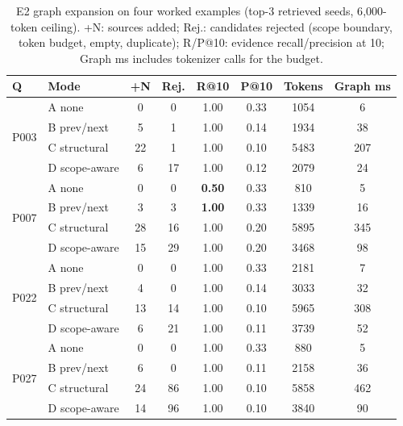 \begin{table}[t]
\centering\footnotesize
\caption{E2 graph expansion on four worked examples (top-3 retrieved seeds, 6{,}000-token ceiling). +N: sources added; Rej.: candidates rejected (scope boundary, token budget, empty, duplicate); R/P@10: evidence recall/precision at 10; Graph ms includes tokenizer calls for the budget.}
\label{tab:e2}
\setlength{\tabcolsep}{2.5pt}
\begin{tabular}{@{}llcccccc@{}}
\toprule
Q & Mode & +N & Rej. & R@10 & P@10 & Tokens & Graph ms \\
\midrule
\multirow{4}{*}{P003} & A none & 0 & 0 & 1.00 & 0.33 & 1054 & 6 \\
 & B prev/next & 5 & 1 & 1.00 & 0.14 & 1934 & 38 \\
 & C structural & 22 & 1 & 1.00 & 0.10 & 5483 & 207 \\
 & D scope-aware & 6 & 17 & 1.00 & 0.12 & 2079 & 24 \\
\midrule
\multirow{4}{*}{P007} & A none & 0 & 0 & \textbf{0.50} & 0.33 & 810 & 5 \\
 & B prev/next & 3 & 3 & \textbf{1.00} & 0.33 & 1339 & 16 \\
 & C structural & 28 & 16 & 1.00 & 0.20 & 5895 & 345 \\
 & D scope-aware & 15 & 29 & 1.00 & 0.20 & 3468 & 98 \\
\midrule
\multirow{4}{*}{P022} & A none & 0 & 0 & 1.00 & 0.33 & 2181 & 7 \\
 & B prev/next & 4 & 0 & 1.00 & 0.14 & 3033 & 32 \\
 & C structural & 13 & 14 & 1.00 & 0.10 & 5965 & 308 \\
 & D scope-aware & 6 & 21 & 1.00 & 0.11 & 3739 & 52 \\
\midrule
\multirow{4}{*}{P027} & A none & 0 & 0 & 1.00 & 0.33 & 880 & 5 \\
 & B prev/next & 6 & 0 & 1.00 & 0.11 & 2158 & 36 \\
 & C structural & 24 & 86 & 1.00 & 0.10 & 5858 & 462 \\
 & D scope-aware & 14 & 96 & 1.00 & 0.10 & 3840 & 90 \\
\bottomrule
\end{tabular}
\end{table}

